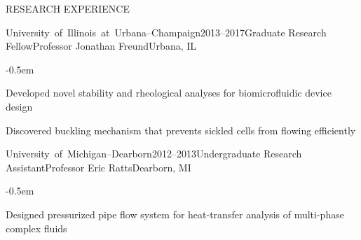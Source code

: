 \documentclass{resume} %
\newcommand{\sepss}{-0.5em}
\newcommand{\negspace}{-0.8em}
\newcommand\UIUC{\mbox{University of Illinois at Urbana--Champaign}}
\newcommand\UMD{\mbox{University of Michigan--Dearborn}}
\begin{document}
\begin{rSection}{{\Large R}ESEARCH EXPERIENCE}
\begin{myrSubsections}{\UIUC}{2013--2017}{Graduate Research Fellow}{Professor Jonathan Freund}{Urbana, IL} 
	\begin{list}{\textbullet}{\leftmargin=2.5em} 
	  	\itemsep \sepss
	  	\vspace{\negspace} 
        \item Developed novel stability and rheological analyses for biomicrofluidic device design
        \item Discovered buckling mechanism that prevents sickled cells from flowing efficiently
  	\end{list}
\end{myrSubsections}


\begin{myrSubsections}{\UMD}{2012--2013}{Undergraduate Research Assistant}{Professor Eric Ratts}{Dearborn, MI} 
	\begin{list}{\textbullet}{\leftmargin=2.5em} 
	  	\itemsep \sepss 
	  	\vspace{\negspace} 
		\item Designed pressurized pipe flow system for heat-transfer analysis of multi-phase complex fluids
  	\end{list}
\end{myrSubsections}

\end{rSection}
\end{document}

